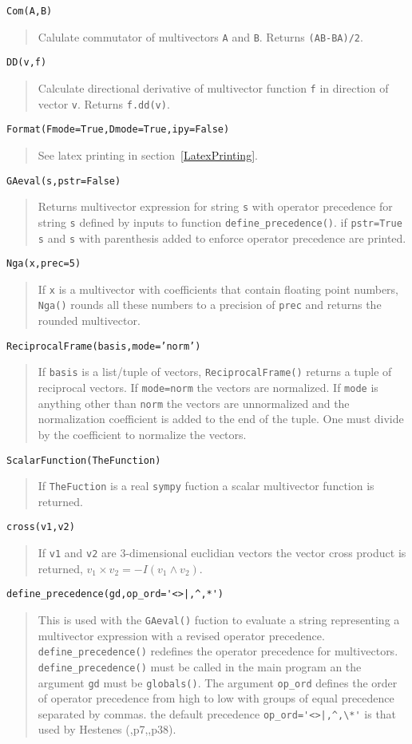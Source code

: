 \documentclass[10pt]{article}
\newcommand{\lp}{\left (}
\newcommand{\rp}{\right )}
\newcommand{\W}{\wedge}
\newcommand{\paren}[1]{\lp {#1} \rp}
\newcommand{\T}[1]{\texttt{#1}}
\begin{document}
\T{Com(A,B)}
\begin{quote}
   Calulate commutator of multivectors \T{A} and \T{B}.  Returns \T{(AB-BA)/2}.
\end{quote}
\T{DD(v,f)}
\begin{quote}
   Calculate directional derivative of multivector function \T{f} in direction of
   vector \T{v}.  Returns \T{f.dd(v)}.
\end{quote}
\T{Format(Fmode=True,Dmode=True,ipy=False)}
\begin{quote}
   See latex printing in section~\ref{LatexPrinting}.
\end{quote}
\T{GAeval(s,pstr=False)}
\begin{quote}
   Returns multivector expression for string \T{s} with operator precedence for
   string \T{s} defined by inputs to function \T{define\_precedence()}.  if \T{pstr=True}
   \T{s} and \T{s} with parenthesis added to enforce operator precedence are printed.
\end{quote}
\T{Nga(x,prec=5)}
\begin{quote}
   If \T{x} is a multivector with coefficients that contain floating point numbers, \T{Nga()}
   rounds all these numbers to a precision of \T{prec} and returns the rounded multivector.
\end{quote}
\T{ReciprocalFrame(basis,mode='norm')}
\begin{quote}
   If \T{basis} is a list/tuple of vectors, \T{ReciprocalFrame()} returns a tuple of reciprocal
   vectors.  If \T{mode=norm} the vectors are normalized.  If \T{mode} is anything other than
   \T{norm} the vectors are unnormalized and the normalization coefficient is added to the
   end of the tuple.  One must divide by the coefficient to normalize the vectors.
\end{quote}
\T{ScalarFunction(TheFunction)}
\begin{quote}
   If \T{TheFuction} is a real \T{sympy} fuction a scalar multivector function is returned.
\end{quote}
\T{cross(v1,v2)}
\begin{quote}
   If \T{v1} and \T{v2} are 3-dimensional euclidian vectors the vector cross product is
   returned, $v_{1}\times v_{2} = -I\paren{v_{1}\W v_{2}}$.
\end{quote}
\lstinline$define_precedence(gd,op_ord='<>|,^,*')$
\begin{quote}
   This is used with the \T{GAeval()} fuction to evaluate a string representing a multivector
   expression with a revised operator precedence.  \T{define\_precedence()} redefines the operator
   precedence for multivectors. \T{define\_precedence()} must be called in the main program an the
   argument \T{gd} must be \T{globals()}.  The argument \T{op\_ord} defines the order of operator
   precedence from high to low with groups of equal precedence separated by commas. the default
   precedence \lstinline$op_ord='<>|,^,\*'$ is that used by Hestenes (\cite{Hestenes},p7,\cite{Doran},p38).
\end{quote}
\end{document}
